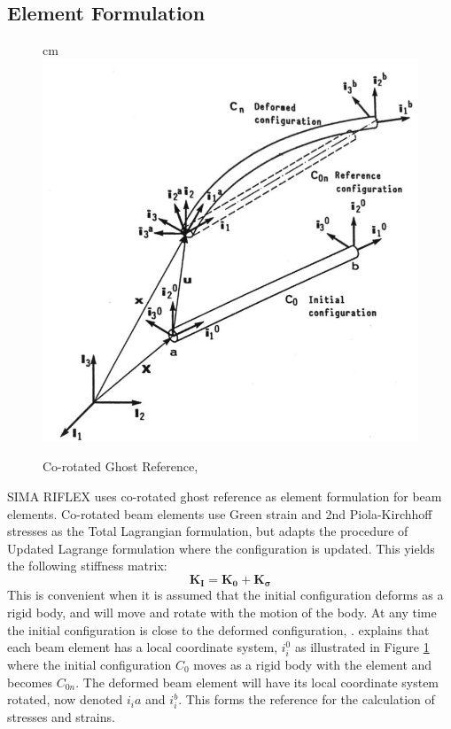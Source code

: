 \subsection{Element Formulation}
\label{sec:ghost}
\begin{figure}
     cm 
    \centering
    \includegraphics[scale=0.5]{figures/coro}
\caption[$\; \:$Co-rotated Ghost Reference]{Co-rotated Ghost Reference, \cite{Mathisen1990} }
 \label{fig:coro}
\end{figure}
SIMA RIFLEX uses co-rotated ghost reference as element formulation for beam elements. Co-rotated beam elements use Green strain and 2nd Piola-Kirchhoff stresses as the Total Lagrangian formulation, but adapts the procedure of Updated Lagrange formulation where the configuration is updated. This yields the following stiffness matrix:
\begin{equation}
    \boldsymbol{K_I}= \boldsymbol{K_0} + \boldsymbol{K_\sigma}
\end{equation}
This is convenient when it is assumed that the initial configuration deforms as a rigid body, and will move and rotate with the motion of the body. At any time the initial configuration is close to the deformed configuration, \cite{sintef2017}. \cite{Mathisen1990} explains that each beam element has a local coordinate system, $i_i^0$ as illustrated in Figure \ref{fig:coro} where the initial configuration $C_0$ moves as a rigid body with the element and becomes $C_{0n}$. The deformed beam element will have its local coordinate system rotated, now denoted $i_ia$ and $i_i^b$. This forms the reference for the calculation of stresses and strains. 

